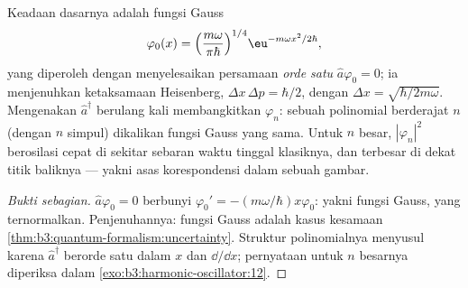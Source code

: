 \begin{proposition}\label{prop:b3:harmonic-oscillator:wavefunctions}
Keadaan dasarnya adalah fungsi Gauss
\[
\varphi_0(x) = \Big(\frac{m\omega}{\pi\hbar}\Big)^{1/4}
\eu^{-m\omega x^2/2\hbar} ,
\]
yang diperoleh dengan menyelesaikan persamaan \emph{orde satu}
$\hat a\varphi_0
= 0$; ia menjenuhkan ketaksamaan Heisenberg, $\Delta x\,\Delta p =
\hbar/2$, dengan $\Delta x = \sqrt{\hbar/2m\omega}$. Mengenakan
$\hat a^\dagger$ berulang kali membangkitkan $\varphi_n$: sebuah
polinomial berderajat $n$ (dengan $n$ simpul) dikalikan fungsi Gauss
yang sama. Untuk $n$ besar, $|\varphi_n|^2$ berosilasi cepat di sekitar
sebaran waktu tinggal klasiknya, dan terbesar di dekat titik baliknya
--- yakni asas korespondensi dalam sebuah gambar.
\end{proposition}

\begin{proof}[Bukti sebagian]
$\hat a\varphi_0 = 0$ berbunyi $\varphi_0' = -(m\omega/\hbar)x
\varphi_0$: yakni fungsi Gauss, yang ternormalkan. Penjenuhannya: fungsi
Gauss adalah kasus kesamaan
\cref{thm:b3:quantum-formalism:uncertainty}. Struktur polinomialnya
menyusul karena $\hat a^\dagger$ berorde satu dalam $x$ dan $\dd/\dd x$;
pernyataan untuk $n$ besarnya diperiksa dalam
\cref{exo:b3:harmonic-oscillator:12}.
\end{proof}

